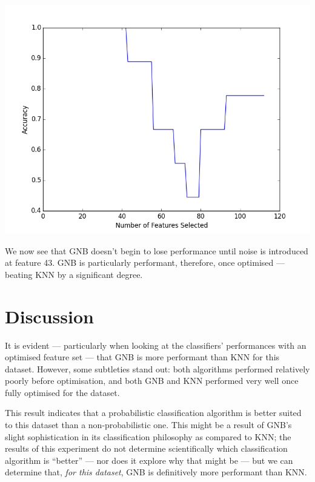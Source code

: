 \documentclass{tufte-handout}
\begin{document}
\includegraphics[width=\textwidth{},keepaspectratio]{gnb_optimal_features__all_features.png}

We now see that GNB doesn't begin to lose performance until noise is introduced at feature 43. GNB is particularly performant, therefore, once optimised --- beating KNN by a significant degree.

\section{Discussion}
It is evident --- particularly when looking at the classifiers' performances with an optimised feature set --- that GNB is more performant than KNN for this dataset. However, some subtleties stand out: both algorithms performed relatively poorly before optimisation, and both GNB and KNN performed very well once fully optimised for the dataset.\par

This result indicates that a probabilistic classification algorithm is better suited to this dataset than a non-probabilistic one. This might be a result of GNB's slight sophistication in its classification philosophy as compared to KNN\@; the results of this experiment do not determine scientifically which classification algorithm is ``better'' --- nor does it explore why that might be --- but we can determine that, \emph{for this dataset}, GNB is definitively more performant than KNN\@.

\pagebreak
\end{document}
